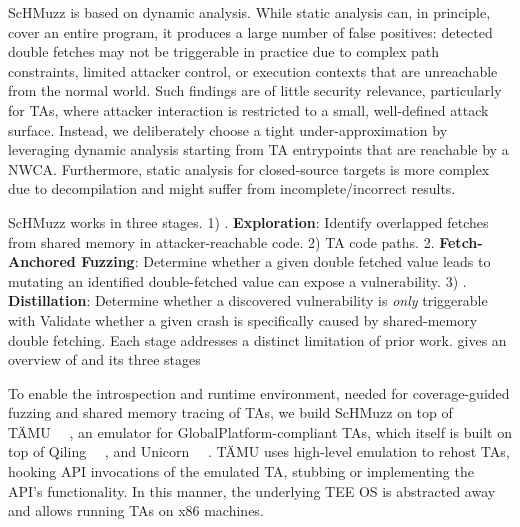 \documentclass[conference]{IEEEtran} %
\newcommand{\sysname}{ScHMuzz\xspace}
\newcommand{\stageone}{Exploration\xspace}
\newcommand{\stagetwo}{Fetch-Anchored Fuzzing\xspace} %
\newcommand{\stagethree}{Distillation\xspace}
\providecommand{\DIFaddtex}[1]{{\protect\color{blue} \sf #1}} %
\providecommand{\DIFdeltex}[1]{{\protect\color{red} \scriptsize #1}} %
\providecommand{\DIFaddbegin}{} %
\providecommand{\DIFaddend}{} %
\providecommand{\DIFdelbegin}{} %
\providecommand{\DIFdelend}{} %
\providecommand{\DIFadd}[1]{\texorpdfstring{\DIFaddtex{#1}}{#1}} %
\providecommand{\DIFdel}[1]{\texorpdfstring{\DIFdeltex{#1}}{}} %
\begin{document}
\sysname is based on dynamic analysis. While static analysis can, in principle, cover an 
entire program, it produces a large number of false positives: detected double fetches 
may not be triggerable in practice due to complex path constraints, limited attacker 
control, or execution contexts that are unreachable from the normal world. Such findings 
are of little security relevance, particularly for TAs, where attacker interaction is 
restricted to a small, well-defined attack surface. Instead, we deliberately choose a 
tight under-approximation by leveraging dynamic analysis starting from TA entrypoints 
that are reachable by a NWCA. Furthermore, static analysis for closed-source targets is more 
complex due to decompilation and might suffer from incomplete/incorrect results.

\sysname works in three stages.
\DIFdelbegin \DIFdel{1) }\DIFdelend \DIFaddbegin \DIFadd{1. }\DIFaddend \textbf{\stageone}: Identify overlapped fetches \DIFaddbegin \DIFadd{from shared memory }\DIFaddend in attacker-reachable \DIFdelbegin \DIFdel{code. 2) }\DIFdelend \DIFaddbegin \DIFadd{TA 
code paths. 2. }\DIFaddend \textbf{\stagetwo}: Determine whether \DIFdelbegin \DIFdel{a given double fetched value leads to }\DIFdelend \DIFaddbegin \DIFadd{mutating an identified 
double-fetched value can expose }\DIFaddend a vulnerability. \DIFdelbegin \DIFdel{3) }\DIFdelend \DIFaddbegin \DIFadd{3. }\DIFaddend \textbf{\stagethree}: \DIFdelbegin \DIFdel{Determine whether 
a discovered vulnerability is }\emph{\DIFdel{only}} %
\DIFdel{triggerable with }\DIFdelend \DIFaddbegin \DIFadd{Validate whether 
a given crash is specifically caused by }\DIFaddend shared-memory double fetching. 
\DIFdelbegin \DIFdel{Each stage addresses a distinct limitation of prior work. }%
\DIFdel{gives an overview of }%
\DIFdel{and its three stages}\DIFdelend \DIFaddbegin 


\DIFadd{To enable the introspection and runtime environment, needed for coverage-guided fuzzing 
and shared memory tracing of TAs, we build }\sysname \DIFadd{on top of TÄMU~\mbox{%
\cite{taemu}}\hskip0pt%
, an emulator 
for GlobalPlatform-compliant TAs, which itself is built on 
top of Qiling~\mbox{%
\cite{qiling}}\hskip0pt%
, and Unicorn~\mbox{%
\cite{unicorn}}\hskip0pt%
.
TÄMU uses high-level emulation to rehost TAs, hooking API invocations of the emulated TA, 
stubbing or implementing the API's functionality. In this manner, the underlying TEE OS is 
abstracted away and allows running TAs on x86 machines}\DIFaddend .
\end{document}
